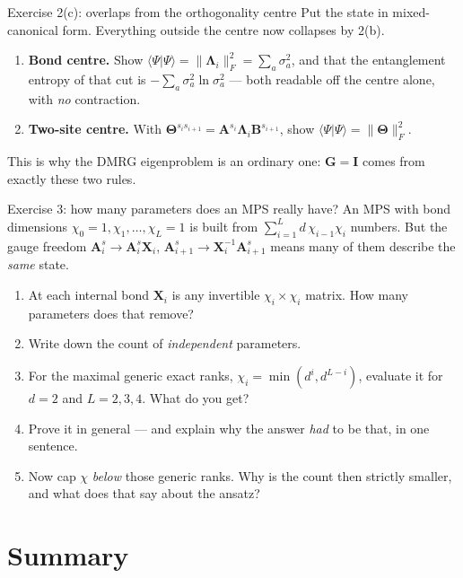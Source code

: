\documentclass[aspectratio=169,10pt]{beamer}
\newcommand{\braket}[2]{\langle #1\vert #2\rangle}
\newcommand{\bmat}[1]{\bm{#1}}
\newcommand{\Amat}[1]{\bm{A}^{#1}}
\newcommand{\Bmat}[1]{\bm{B}^{#1}}
\begin{document}
\begin{frame}{Exercise 2(c): overlaps from the orthogonality centre}
  Put the state in mixed-canonical form. Everything outside the centre now collapses by 2(b).
  \begin{enumerate}
    \item \textbf{Bond centre.} Show $\braket\Psi\Psi=\|\bm\Lambda_i\|_F^2=\sum_a\sigma_a^2$, and that the entanglement entropy of that cut is $-\sum_a\sigma_a^2\ln\sigma_a^2$ --- both readable off the centre alone, with \emph{no} contraction.
    \item \textbf{Two-site centre.} With $\bm\Theta^{s_is_{i+1}}=\Amat{s_i}\bm\Lambda_i\Bmat{s_{i+1}}$, show $\braket\Psi\Psi=\|\bm\Theta\|_F^2$.
  \end{enumerate}
  \centering\small\alert{This is why the DMRG eigenproblem is an ordinary one: $\bmat G=\bmat I$ comes from exactly these two rules.}
\end{frame}

\begin{frame}{Exercise 3: how many parameters does an MPS really have?}
  An MPS with bond dimensions $\chi_0=1,\chi_1,\dots,\chi_L=1$ is built from $\sum_{i=1}^{L}d\,\chi_{i-1}\chi_i$ numbers. But the gauge freedom
  $\Amat{s}_i\to\Amat{s}_i\bmat X_i$, $\Amat{s}_{i+1}\to\bmat X_i^{-1}\Amat{s}_{i+1}$ means many of them describe the \emph{same} state.
  \begin{enumerate}
    \item At each internal bond $\bmat X_i$ is any invertible $\chi_i\times\chi_i$ matrix. How many parameters does that remove?
    \item Write down the count of \emph{independent} parameters.
    \item For the \alert{maximal generic exact ranks}, $\chi_i=\min(d^i,d^{L-i})$, evaluate it for $d=2$ and $L=2,3,4$. What do you get?
    \item Prove it in general --- and explain why the answer \emph{had} to be that, in one sentence.
    \item Now cap $\chi$ \emph{below} those generic ranks. Why is the count then strictly smaller, and what does that say about the ansatz?
  \end{enumerate}
\end{frame}

\section{Summary}
\end{document}
